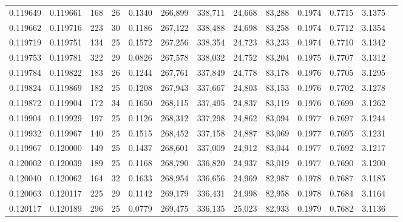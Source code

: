 \begin{tabular}{rrrrrrrrrrrrr}
0.119649 & 0.119661 & 168 &  26 &                                     0.1340 & 266,899 & 338,711 &  24,668 &  83,288 & 0.1974 & 0.7715 & 3.1375 \\
0.119662 & 0.119716 & 223 &  30 &                                     0.1186 & 267,122 & 338,488 &  24,698 &  83,258 & 0.1974 & 0.7712 & 3.1354 \\
0.119719 & 0.119751 & 134 &  25 &                                     0.1572 & 267,256 & 338,354 &  24,723 &  83,233 & 0.1974 & 0.7710 & 3.1342 \\
0.119753 & 0.119781 & 322 &  29 &                                     0.0826 & 267,578 & 338,032 &  24,752 &  83,204 & 0.1975 & 0.7707 & 3.1312 \\
0.119784 & 0.119822 & 183 &  26 &                                     0.1244 & 267,761 & 337,849 &  24,778 &  83,178 & 0.1976 & 0.7705 & 3.1295 \\
0.119824 & 0.119869 & 182 &  25 &                                     0.1208 & 267,943 & 337,667 &  24,803 &  83,153 & 0.1976 & 0.7702 & 3.1278 \\
0.119872 & 0.119904 & 172 &  34 &                                     0.1650 & 268,115 & 337,495 &  24,837 &  83,119 & 0.1976 & 0.7699 & 3.1262 \\
0.119904 & 0.119929 & 197 &  25 &                                     0.1126 & 268,312 & 337,298 &  24,862 &  83,094 & 0.1977 & 0.7697 & 3.1244 \\
0.119932 & 0.119967 & 140 &  25 &                                     0.1515 & 268,452 & 337,158 &  24,887 &  83,069 & 0.1977 & 0.7695 & 3.1231 \\
0.119967 & 0.120000 & 149 &  25 &                                     0.1437 & 268,601 & 337,009 &  24,912 &  83,044 & 0.1977 & 0.7692 & 3.1217 \\
0.120002 & 0.120039 & 189 &  25 &                                     0.1168 & 268,790 & 336,820 &  24,937 &  83,019 & 0.1977 & 0.7690 & 3.1200 \\
0.120040 & 0.120062 & 164 &  32 &                                     0.1633 & 268,954 & 336,656 &  24,969 &  82,987 & 0.1978 & 0.7687 & 3.1185 \\
0.120063 & 0.120117 & 225 &  29 &                                     0.1142 & 269,179 & 336,431 &  24,998 &  82,958 & 0.1978 & 0.7684 & 3.1164 \\
0.120117 & 0.120189 & 296 &  25 &                                     0.0779 & 269,475 & 336,135 &  25,023 &  82,933 & 0.1979 & 0.7682 & 3.1136 \\

\end{tabular}
